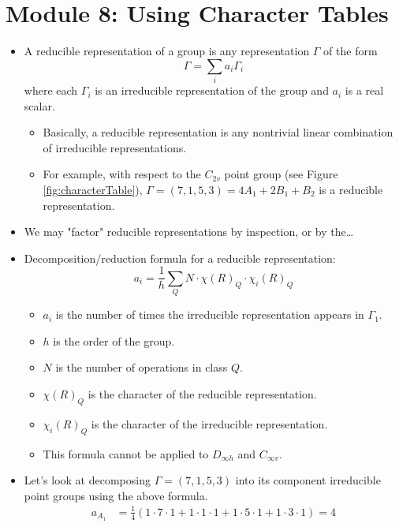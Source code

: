 \documentclass[../notes.tex]{subfiles}
\begin{document}
\section{Module 8: Using Character Tables}
\begin{itemize}
    \item A reducible representation of a group is any representation $\Gamma$ of the form
    \begin{equation*}
        \Gamma = \sum_ia_i\Gamma_i
    \end{equation*}
    where each $\Gamma_i$ is an irreducible representation of the group and $a_i$ is a real scalar.
    \begin{itemize}
        \item Basically, a reducible representation is any nontrivial linear combination of irreducible representations.
        \item For example, with respect to the $C_{2v}$ point group (see Figure \ref{fig:characterTable}), $\Gamma=(7,1,5,3)=4A_1+2B_1+B_2$ is a reducible representation.
    \end{itemize}
    \item We may "factor" reducible representations by inspection, or by the\dots
    \item Decomposition/reduction formula for a reducible representation:
    \begin{equation*}
        a_i = \frac{1}{h}\sum_QN\cdot\chi(R)_Q\cdot\chi_i(R)_Q
    \end{equation*}
    \begin{itemize}
        \item $a_i$ is the number of times the irreducible representation appears in $\Gamma_1$.
        \item $h$ is the order of the group.
        \item $N$ is the number of operations in class $Q$.
        \item $\chi(R)_Q$ is the character of the reducible representation.
        \item $\chi_i(R)_Q$ is the character of the irreducible representation.
        \item This formula cannot be applied to $D_{\infty h}$ and $C_{\infty v}$.
    \end{itemize}
    \item Let's look at decomposing $\Gamma=(7,1,5,3)$ into its component irreducible point groups using the above formula.
    \begin{align*}
        a_{A_1} &= \frac{1}{4}(1\cdot 7\cdot 1+1\cdot 1\cdot 1 +1\cdot 5\cdot 1 +1\cdot 3\cdot 1 ) = 4\\

\end{align*}
\end{itemize}
\end{document}
